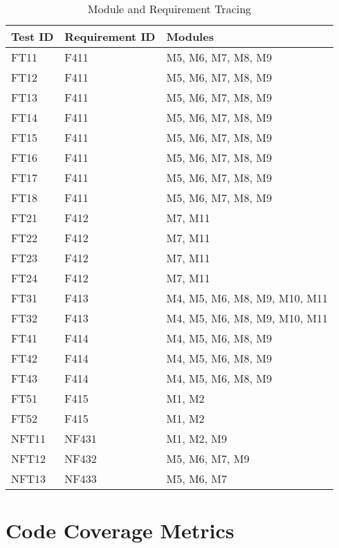 \documentclass[12pt, titlepage]{article}
\begin{document}
\begin{table}[H]

  \centering
  \caption{Module and Requirement Tracing}
  \begin{tabular}{|l|l|l|}
  \hline
  \textbf{Test ID} & \textbf{Requirement ID} & \textbf{Modules}\\
  \hline
  FT11 & F411 & M5, M6, M7, M8, M9\\
  \hline
  FT12 & F411 & M5, M6, M7, M8, M9\\
  \hline
  FT13 & F411 & M5, M6, M7, M8, M9\\
  \hline
  FT14 & F411 & M5, M6, M7, M8, M9\\
  \hline
  FT15 & F411 & M5, M6, M7, M8, M9\\
  \hline
  FT16 & F411 & M5, M6, M7, M8, M9\\
  \hline
  FT17 & F411 & M5, M6, M7, M8, M9\\
  \hline
  FT18 & F411 & M5, M6, M7, M8, M9\\
  \hline
  FT21 & F412 & M7, M11\\
  \hline
  FT22 & F412 & M7, M11\\
  \hline
  FT23& F412 & M7, M11\\
  \hline
  FT24 & F412 & M7, M11\\
  \hline
  FT31 & F413 & M4, M5, M6, M8, M9, M10, M11\\
  \hline
  FT32 & F413 & M4, M5, M6, M8, M9, M10, M11\\
  \hline
  FT41 & F414 & M4, M5, M6, M8, M9\\
  \hline
  FT42 & F414 & M4, M5, M6, M8, M9\\
  \hline
  FT43 & F414 & M4, M5, M6, M8, M9\\
  \hline
  FT51 & F415 & M1, M2\\
  \hline
  FT52 & F415 & M1, M2\\
  \hline
  NFT11 & NF431 & M1, M2, M9\\
  \hline
  NFT12 & NF432 & M5, M6, M7, M9\\
  \hline
  NFT13 & NF433 & M5, M6, M7\\
  \hline
  \end{tabular}
\end{table}

\section{Code Coverage Metrics}



\end{document}
